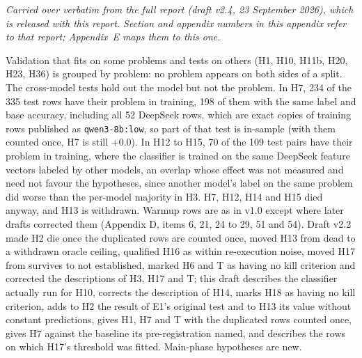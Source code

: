 \emph{Carried over verbatim from the full report (draft v2.4, 23 September 2026), which is released with this report. Section and appendix numbers in this appendix refer to that report; Appendix~E maps them to this one.}

Validation that fits on some problems and tests on others (H1, H10, H11b, H20, H23, H36) is grouped by problem: no problem appears on both sides of a split. The cross-model tests hold out the model but not the problem. In H7, 234 of the 335 test rows have their problem in training, 198 of them with the same label and base accuracy, including all 52 DeepSeek rows, which are exact copies of training rows published as \texttt{qwen3-8b:low}, so part of that test is in-sample (with them counted once, H7 is still +0.0). In H12 to H15, 70 of the 109 test pairs have their problem in training, where the classifier is trained on the same DeepSeek feature vectors labeled by other models, an overlap whose effect was not measured and need not favour the hypotheses, since another model's label on the same problem did worse than the per-model majority in H3. H7, H12, H14 and H15 died anyway, and H13 is withdrawn. Warmup rows are as in v1.0 except where later drafts corrected them (Appendix D, items 6, 21, 24 to 29, 51 and 54). Draft v2.2 made H2 die once the duplicated rows are counted once, moved H13 from dead to a withdrawn oracle ceiling, qualified H16 as within re-execution noise, moved H17 from survives to not established, marked H6 and T as having no kill criterion and corrected the descriptions of H3, H17 and T; this draft describes the classifier actually run for H10, corrects the description of H14, marks H18 as having no kill criterion, adds to H2 the result of E1's original test and to H13 its value without constant predictions, gives H1, H7 and T with the duplicated rows counted once, gives H7 against the baseline its pre-registration named, and describes the rows on which H17's threshold was fitted. Main-phase hypotheses are new.

